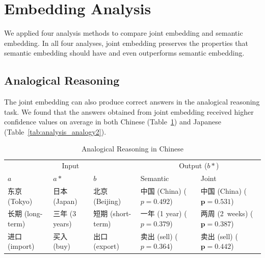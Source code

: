 \section{Embedding Analysis} \label{sec:analysis}

We applied four analysis methods to compare joint embedding and semantic embedding. In all four analyses, joint embedding preserves the properties that semantic embedding should have and even outperforms semantic embedding.

\subsection{Analogical Reasoning} \label{sec:analysis_analogy}

The joint embedding can also produce correct answers in the analogical reasoning task.  We found that the answers obtained from joint embedding received higher confidence values on average in both Chinese (Table~\ref{tab:analysis_analogy1}) and Japanese (Table~\ref{tab:analysis_analogy2}). 

\begin{table}[h]
    \centering
    \begin{CJK}{UTF8}{gbsn}
        \begin{tabularx}{\textwidth}{lllbb}
            \toprule
            \multicolumn{3}{c}{Input} & \multicolumn{2}{c}{Output ($b*$)} \\
            \cmidrule(lr){1-3} \cmidrule(lr){4-5} $a$ & $a*$ & $b$ & Semantic & Joint \\\midrule
            \vspace{0.2cm} 东京 (Tokyo) & 日本 (Japan) & 北京 (Beijing) & 中国 (China) \newline ($p=0.492$) & 中国 (China) \newline ($\bm{p=0.531}$) \\
            \vspace{0.2cm} 长期 (long-term) & 三年 (3 years) & 短期 (short-term) & 一年 (1 year) \newline ($p=0.379$) & \mbox{两周} (\mbox{2 weeks}) \newline ($\bm{p=0.387}$) \\
            进口 (import) & 买入 (buy) & 出口 (export) & 卖出 (sell) \newline ($p=0.364$) & 卖出 (sell) \newline ($\bm{p=0.442}$)\\\bottomrule
        \end{tabularx}
    \end{CJK}
    \caption{Analogical Reasoning in Chinese}
    \label{tab:analysis_analogy1}
\end{table}

